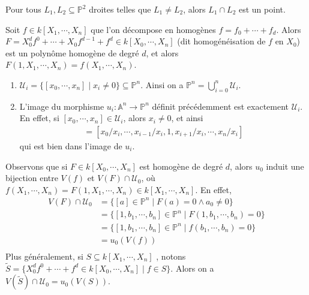         \begin{exo}
            Pour tous $L_1, L_2 \subseteq \mathbb{P}^2$ droites telles que $L_1 \neq L_2$, alors $L_1 \cap L_2$ est un point.
        \end{exo}
        \begin{remq}
            Soit $f \in k[X_1, \cdots, X_n]$ que l'on décompose en homogènes $f = f_0 + \cdots + f_d$.  Alors $F = X_0^df^0 + \cdots + X_0f^{d-1} + f^d \in k[X_0, \cdots, X_n]$ (dit homogénéisation de $f$ en $X_0$) est un polynôme homogène de degré $d$, et alors $F(1,X_1, \cdots, X_n) = f(X_1, \cdots, X_n)$.
        \end{remq}
        \begin{nota}
            \begin{enumerate}
                \item $\mathcal{U}_i = \{[x_0, \cdots, x_n] \mid x_i \neq 0\} \subseteq \mathbb{P}^n$. Ainsi on a $\mathbb{P}^n = \bigcup_{i = 0}^n \mathcal{U}_i$.
                \item L'image du morphisme $u_i : \mathbb{A}^n \to \mathbb{P}^n$ définit précédemment est exactement $\mathcal{U}_i$. En effet, si $[x_0, \cdots, x_n] \in \mathcal{U}_i$, alors $x_i \neq 0$, et ainsi
                \begin{align*}
                    [x_0, \cdots, x_n] = [x_0/x_i, \cdots, x_{i-1}/x_i, 1, x_{i+1}/x_i, \cdots, x_n/x_i]
                \end{align*}
                qui est bien dans l'image de $u_i$.
            \end{enumerate}
        \end{nota}
        Observons que si $F \in k[X_0, \cdots, X_n]$ est homogène de degré $d$, alors $u_0$ induit une bijection entre $V(f)$ et $V(F) \cap \mathcal{U}_0$, où $f(X_1, \cdots, X_n) = F(1, X_1, \cdots, X_n) \in k[X_1, \cdots, X_n]$. En effet, 
        \begin{align*}
            V(F) \cap \mathcal{U}_0 &= \{[a] \in \mathbb{P}^n \mid F(a) = 0 \land a_0 \neq 0\} \\
            &= \{[1, b_1, \cdots, b_n] \in \mathbb{P}^n \mid F(1,b_1, \cdots, b_n) = 0\} \\
            &= \{[1, b_1, \cdots, b_n] \in \mathbb{P}^n \mid f(b_1, \cdots, b_n) = 0\} \\
            &= u_0(V(f)) \\
        \end{align*}
        Plus généralement, si $S \subseteq k[X_1, \cdots, X_n]$ , notons $\tilde S = \{X_0^df^0 + \cdots + f^d \in k[X_0, \cdots, X_n] \mid f \in S\}$. Alors on a $V(\tilde S) \cap \mathcal{U}_0 = u_0(V(S))$.

